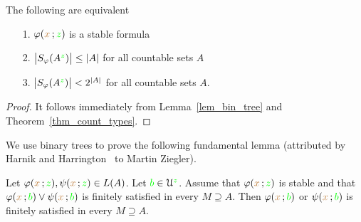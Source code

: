 \begin{corollary}\label{corol_count_types}
The following are equivalent
\begin{itemize}
\item[1.] $\varphi({\color{brown} x}\,;{\color{green} z})$ is a stable formula
\item[2.] $\big|S_{\varphi}(A^{\color{green} z})\big|\le|A|$ for all countable sets $A$
\item[3.] $\big|S_{\varphi}(A^{\color{green} z})\big|<2^{|A|}$ for all countable sets $A$.
\end{itemize}
\end{corollary}

\begin{proof}
  It follows immediately from Lemma~\ref{lem_bin_tree} and Theorem~\ref{thm_count_types}.
\end{proof}

We use binary trees to prove the following fundamental lemma (attributed by Harnik and Harrington~\cite{HH} to Martin Ziegler).

\begin{lemma}\label{lem_ziegler}
   Let $\varphi({\color{brown} x}\,;{\color{green} z}),\psi({\color{brown} x}\,;{\color{green} z}) \in L(A)$.
   Let ${\color{green} b}\in\EuScript U^{\color{green} z}$.
   Assume that $\varphi({\color{brown} x}\,;{\color{green} z})$ is stable and that $\varphi({\color{brown} x}\,;{\color{green} b})\vee\psi({\color{brown} x}\,;{\color{green} b})$ is finitely satisfied in every $M\supseteq A$.
   Then $\varphi({\color{brown} x}\,;{\color{green} b})$ or $\psi({\color{brown} x}\,;{\color{green} b})$ is finitely satisfied in every $M\supseteq A$.
\end{lemma} 

